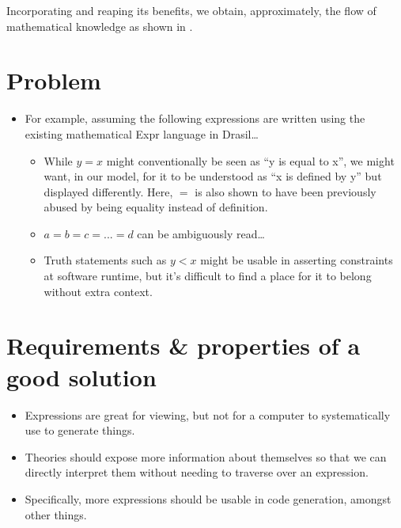 
Incorporating \ModelKinds{} and reaping its benefits, we obtain, approximately,
the flow of mathematical knowledge as shown in .

\theoriesWithModelKinds{}


\section{Problem}

\begin{itemize}

	\item For example, assuming the following expressions are written using the
	      existing mathematical Expr language in Drasil\ldots{}
	      \begin{itemize}

		      \item While \(y = x\) might conventionally be seen as ``y is equal
		            to x'', we might want, in our model, for it to be understood
		            as ``x is defined by y'' but displayed differently. Here,
		            \(=\) is also shown to have been previously abused by being
		            equality instead of definition.

		      \item \(a = b = c = ... = d\) can be ambiguously read\ldots{}

		      \item Truth statements such as \(y < x\) might be usable in
		            asserting constraints at software runtime, but it's
		            difficult to find a place for it to belong without extra
		            context.

	      \end{itemize}

\end{itemize}

\section{Requirements \& properties of a good solution}

\begin{itemize}

	\item Expressions are great for viewing, but not for a computer to
	      systematically use to generate things.

	\item Theories should expose more information about themselves so that we
	      can directly interpret them without needing to traverse over an
	      expression.

	\item Specifically, more expressions should be usable in code generation,
	      amongst other things.

\end{itemize}

